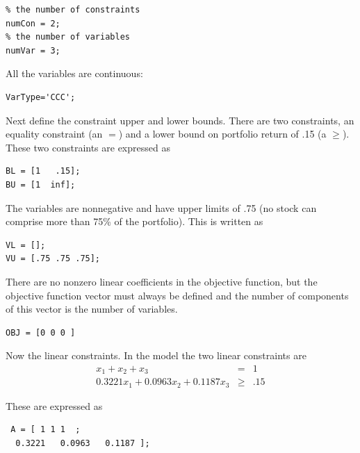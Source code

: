 \documentclass[11pt]{article}
\renewcommand{\_}{{\char"5F}}
\renewcommand{\{}{{\char"7B}}
\renewcommand{\}}{{\char"7D}}
\renewcommand{\^}{{\char"0D}}
\renewcommand{\'}{{\char"0D}}
\begin{document}
\begin{enumerate}[Step 1:]
\begin{verbatim}
% the number of constraints
numCon = 2;
% the number of variables
numVar = 3;
\end{verbatim}



All the variables are continuous:


\begin{verbatim}
VarType='CCC';
\end{verbatim}


Next define the constraint upper and lower bounds. There are two constraints, an equality  constraint (an $=$) and a lower bound on portfolio return of .15 (a $\ge$). These two constraints are expressed as



\begin{verbatim}
BL = [1   .15];
BU = [1  inf];
\end{verbatim}



The variables are nonnegative and have upper limits of .75 (no stock can comprise more than 75\% of the portfolio).  This is written as




\begin{verbatim}
VL = [];
VU = [.75 .75 .75];
\end{verbatim}



There are no nonzero linear coefficients in the objective function, but the objective function vector must always be defined and the number of components of this vector is the number of variables.



\begin{verbatim}
OBJ = [0 0 0 ]
\end{verbatim}


 Now the linear constraints.   In the model the two linear constraints are
 \begin{eqnarray*}
 x_{1} + x_{2} + x_{3} &=& 1 \\
 0.3221 x_{1} +   0.0963x_{2} +    0.1187x_{3}  &\ge& .15
 \end{eqnarray*}



 These are expressed as



 \begin{verbatim}
 A = [ 1 1 1  ;
  0.3221   0.0963   0.1187 ];
 \end{verbatim}



\end{enumerate}
\end{document}
